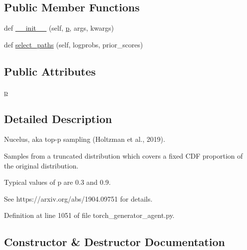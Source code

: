 \subsection*{Public Member Functions}
\begin{DoxyCompactItemize}
\item 
def \hyperlink{classparlai_1_1core_1_1torch__generator__agent_1_1NucleusSampling_a90c444c7fa1f76baac3a54fc7c980e15}{\+\_\+\+\_\+init\+\_\+\+\_\+} (self, \hyperlink{classparlai_1_1core_1_1torch__generator__agent_1_1NucleusSampling_a54a43b58e2e2cf7da776c40311e0a3c1}{p}, args, kwargs)
\item 
def \hyperlink{classparlai_1_1core_1_1torch__generator__agent_1_1NucleusSampling_a91abde2fb2dccf5cd0564825ddc5ea4d}{select\+\_\+paths} (self, logprobs, prior\+\_\+scores)
\end{DoxyCompactItemize}
\subsection*{Public Attributes}
\begin{DoxyCompactItemize}
\item 
\hyperlink{classparlai_1_1core_1_1torch__generator__agent_1_1NucleusSampling_a54a43b58e2e2cf7da776c40311e0a3c1}{p}
\end{DoxyCompactItemize}


\subsection{Detailed Description}
\begin{DoxyVerb}Nucelus, aka top-p sampling (Holtzman et al., 2019).

Samples from a truncated distribution which covers a fixed CDF proportion
of the original distribution.

Typical values of p are 0.3 and 0.9.

See https://arxiv.org/abs/1904.09751 for details.
\end{DoxyVerb}
 

Definition at line 1051 of file torch\+\_\+generator\+\_\+agent.\+py.



\subsection{Constructor \& Destructor Documentation}
\mbox{\label{classparlai_1_1core_1_1torch__generator__agent_1_1NucleusSampling_a90c444c7fa1f76baac3a54fc7c980e15}} 
